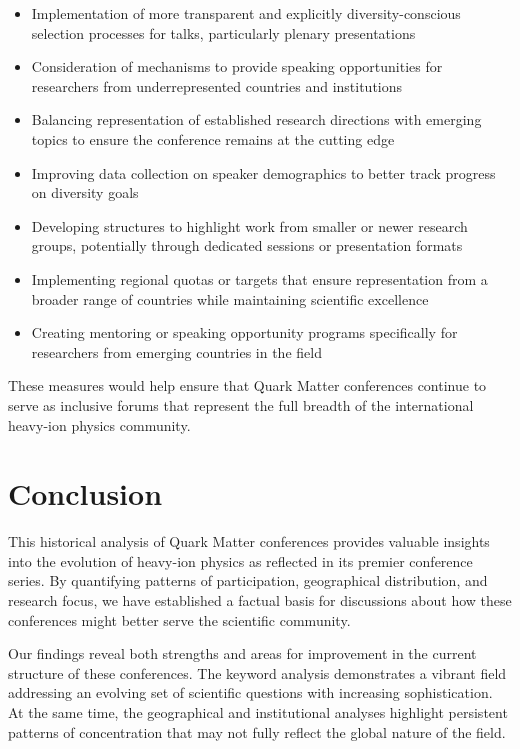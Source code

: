 \documentclass[a4paper,11pt]{article}
\begin{document}
\begin{itemize}
    \item Implementation of more transparent and explicitly diversity-conscious selection processes for talks, particularly plenary presentations
    \item Consideration of mechanisms to provide speaking opportunities for researchers from underrepresented countries and institutions
    \item Balancing representation of established research directions with emerging topics to ensure the conference remains at the cutting edge
    \item Improving data collection on speaker demographics to better track progress on diversity goals
    \item Developing structures to highlight work from smaller or newer research groups, potentially through dedicated sessions or presentation formats
    \item Implementing regional quotas or targets that ensure representation from a broader range of countries while maintaining scientific excellence
    \item Creating mentoring or speaking opportunity programs specifically for researchers from emerging countries in the field
\end{itemize}

These measures would help ensure that Quark Matter conferences continue to serve as inclusive forums that represent the full breadth of the international heavy-ion physics community.

\section{Conclusion}

This historical analysis of Quark Matter conferences provides valuable insights into the evolution of heavy-ion physics as reflected in its premier conference series. By quantifying patterns of participation, geographical distribution, and research focus, we have established a factual basis for discussions about how these conferences might better serve the scientific community.

Our findings reveal both strengths and areas for improvement in the current structure of these conferences. The keyword analysis demonstrates a vibrant field addressing an evolving set of scientific questions with increasing sophistication. At the same time, the geographical and institutional analyses highlight persistent patterns of concentration that may not fully reflect the global nature of the field.
\end{document}
